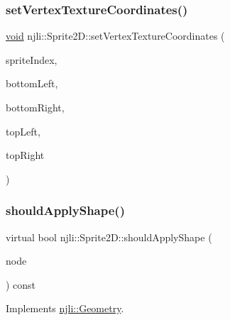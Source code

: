 \mbox{\label{classnjli_1_1_sprite2_d_a2616b43af1538ab520962098e76372be}} 
\subsubsection{\texorpdfstring{set\+Vertex\+Texture\+Coordinates()}{setVertexTextureCoordinates()}}
{\footnotesize\ttfamily \mbox{\hyperlink{_thread_8h_af1e856da2e658414cb2456cb6f7ebc66}{void}} njli\+::\+Sprite2\+D\+::set\+Vertex\+Texture\+Coordinates (\begin{DoxyParamCaption}\item[{const \mbox{\hyperlink{_util_8h_ad758b7a5c3f18ed79d2fcd23d9f16357}{u64}}}]{sprite\+Index,  }\item[{const bt\+Vector2 \&}]{bottom\+Left,  }\item[{const bt\+Vector2 \&}]{bottom\+Right,  }\item[{const bt\+Vector2 \&}]{top\+Left,  }\item[{const bt\+Vector2 \&}]{top\+Right }\end{DoxyParamCaption})\hspace{0.3cm}{\ttfamily [protected]}}

\mbox{\label{classnjli_1_1_sprite2_d_a7815fc6f5a2174a560721310fa4bd92f}} 
\subsubsection{\texorpdfstring{should\+Apply\+Shape()}{shouldApplyShape()}}
{\footnotesize\ttfamily virtual bool njli\+::\+Sprite2\+D\+::should\+Apply\+Shape (\begin{DoxyParamCaption}\item[{\mbox{\hyperlink{classnjli_1_1_node}{Node}} $\ast$}]{node }\end{DoxyParamCaption}) const\hspace{0.3cm}{\ttfamily [virtual]}}



Implements \mbox{\hyperlink{classnjli_1_1_geometry_a9d2e2064f925d9be17ed7fb1b84b728a}{njli\+::\+Geometry}}.

